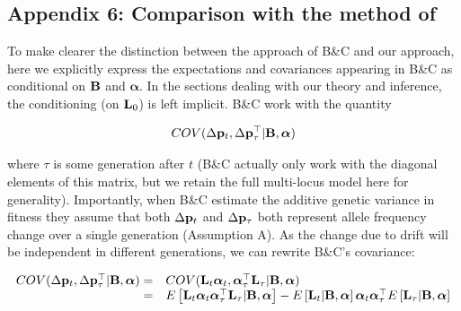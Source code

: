 \documentclass[12pt]{article}
\begin{document}
\begin{bibunit}
\section{Appendix 6: Comparison with the method of \citet{buffalo2019linked}}
\label{App:BandC}

To make clearer the distinction between the approach of B\&C and our approach, here we explicitly express the expectations and covariances appearing in B\&C as conditional on ${\bf B}$ and $\boldsymbol{\alpha}$. In the sections dealing with our theory and inference, the conditioning (on ${\bf L}_0$) is left implicit. B\&C work with the quantity

\begin{equation}
COV(\Delta {\bf p}_t, \Delta {\bf p}_{\tau}^{\top} | {\bf B}, \boldsymbol{\alpha})
\end{equation}

where $\tau$ is some generation after $t$ (B\&C actually only work with the diagonal elements of this matrix, but we retain the full multi-locus model here for generality). Importantly, when B\&C estimate the additive genetic variance in fitness they assume that both $\Delta {\bf p}_t$ and $\Delta {\bf p}_{\tau}$ both represent allele frequency change over a single generation (Assumption A). As the change due to drift will be independent in different generations, we can rewrite B\&C's covariance: 

\begin{equation}
\begin{array}{rl}
COV(\Delta {\bf p}_t, \Delta {\bf p}_{\tau}^\top  | {\bf B}, \boldsymbol{\alpha}) 
=& COV({\bf L}_t\boldsymbol{\alpha}_t,  \boldsymbol{\alpha}_{\tau}^{\top}{\bf L}_{\tau}  | {\bf B}, \boldsymbol{\alpha})\\
=& E\left[{\bf L}_t\boldsymbol{\alpha}_t\boldsymbol{\alpha}_{\tau}^{\top}{\bf L}_{\tau} | {\bf B}, \boldsymbol{\alpha}\right]-E\left[{\bf L}_t | {\bf B}, \boldsymbol{\alpha}\right]\boldsymbol{\alpha}_t \boldsymbol{\alpha}_{\tau}^{\top}E\left[{\bf L}_{\tau} | {\bf B}, \boldsymbol{\alpha}\right]\\
\end{array}
\label{Eq:BCcov1}
\end{equation}


\end{bibunit}
\end{document}
